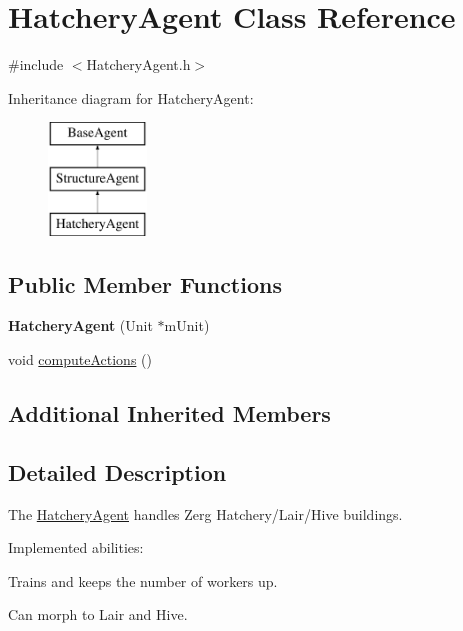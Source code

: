 \hypertarget{class_hatchery_agent}{\section{Hatchery\-Agent Class Reference}
\label{class_hatchery_agent}
}


{\ttfamily \#include $<$Hatchery\-Agent.\-h$>$}

Inheritance diagram for Hatchery\-Agent\-:\begin{figure}[H]
\begin{center}
\leavevmode
\includegraphics[height=3.000000cm]{class_hatchery_agent}
\end{center}
\end{figure}
\subsection*{Public Member Functions}
\begin{DoxyCompactItemize}
\item 
\hypertarget{class_hatchery_agent_a5b823cee3fee939a1d2742749e4ba633}{{\bfseries Hatchery\-Agent} (Unit $\ast$m\-Unit)}\label{class_hatchery_agent_a5b823cee3fee939a1d2742749e4ba633}

\item 
void \hyperlink{class_hatchery_agent_ae96945db71ce4347b2599e9af4da6bf2}{compute\-Actions} ()
\end{DoxyCompactItemize}
\subsection*{Additional Inherited Members}


\subsection{Detailed Description}
The \hyperlink{class_hatchery_agent}{Hatchery\-Agent} handles Zerg Hatchery/\-Lair/\-Hive buildings.

Implemented abilities\-:
\begin{DoxyItemize}
\item Trains and keeps the number of workers up.
\item Can morph to Lair and Hive.
\end{DoxyItemize}

